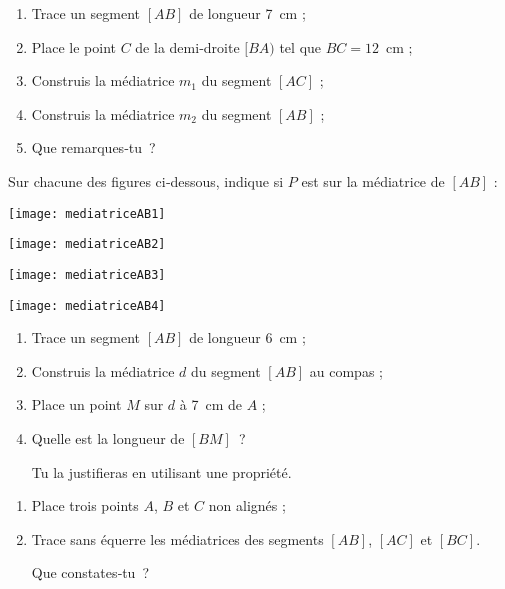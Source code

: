 \begin{exercice}
 \begin{enumerate}
  \item Trace un segment $[AB]$ de longueur 7 cm ;
  \item Place le point $C$ de la demi‑droite $[BA)$ tel que $BC = 12$ cm ;
  \item Construis la médiatrice $m_1$ du segment $[AC]$ ;
  \item Construis la médiatrice $m_2$ du segment $[AB]$ ;
  \item Que remarques‑tu ?
  \end{enumerate}
\end{exercice}


\begin{exercice}[Reconnaître]
Sur chacune des figures ci‑dessous, indique si $P$ est sur la médiatrice de $[AB]$ : \\[0.5em]
 \begin{colenumerate}{2}
  \item 
  
  \texttt{[image: mediatriceAB1]}
  \item 
  
  \texttt{[image: mediatriceAB2]}
  \item 
  
  \texttt{[image: mediatriceAB3]}
  \item 
  
  \texttt{[image: mediatriceAB4]}
  \end{colenumerate}
\end{exercice}
 
 
\begin{exercice}[Construction]
 \begin{enumerate}
 \item Trace un segment $[AB]$ de longueur 6 cm ;
 \item Construis la médiatrice $d$ du segment $[AB]$ au compas ;
 \item Place un point $M$ sur $d$ à 7 cm de $A$ ;
 \item Quelle est la longueur de $[BM]$ ? 
 
Tu la justifieras en utilisant une propriété.
  \end{enumerate}
\end{exercice}


\begin{exercice}
 \begin{enumerate}
 \item Place trois points $A$, $B$ et $C$ non alignés ;
 \item Trace sans équerre les médiatrices des segments $[AB]$, $[AC]$ et $[BC]$. 
 
 Que constates‑tu ?
 \end{enumerate}
\end{exercice}

